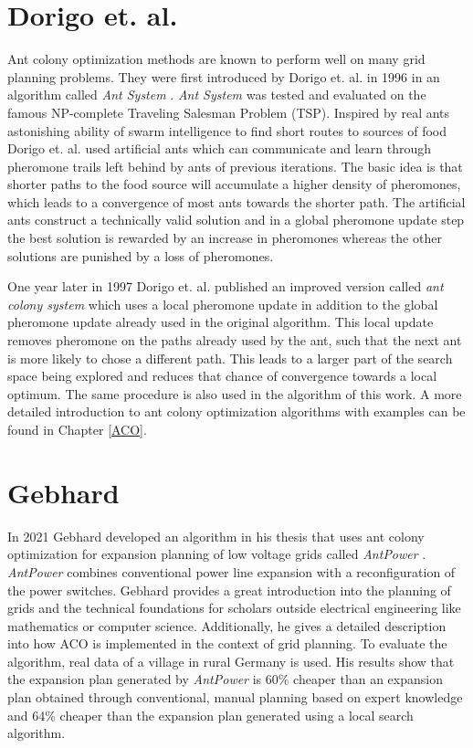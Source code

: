 \section{Dorigo et. al.}
Ant colony optimization methods are known to perform well on many grid planning problems. They were first introduced by Dorigo et. al. in 1996 in an algorithm called \textit{Ant System} \cite{ant_system}. \textit{Ant System} was tested and evaluated on the famous NP-complete Traveling Salesman Problem (TSP). Inspired by real ants astonishing ability of swarm intelligence to find short routes to sources of food Dorigo et. al. used artificial ants which can communicate and learn through pheromone trails left behind by ants of previous iterations.
The basic idea is that shorter paths to the food source will accumulate a higher density of pheromones, which leads to a convergence of most ants towards the shorter path. The artificial ants construct a technically valid solution and in a global pheromone update step the best solution is rewarded by an increase in pheromones whereas the other solutions are punished by a loss of pheromones.

One year later in 1997 Dorigo et. al. published an improved version called \textit{ant colony system} \cite{ant_coloy_system} which uses a local pheromone update in addition to the global pheromone update already used in the original algorithm. This local update removes pheromone on the paths already used by the ant, such that the next ant is more likely to chose a different path. This leads to a larger part of the search space being explored and reduces that chance of convergence towards a local optimum. The same procedure is also used in the algorithm of this work. A more detailed introduction to ant colony optimization algorithms with examples can be found in Chapter \ref{ACO}.\\

\section{Gebhard}
In 2021 Gebhard developed an algorithm in his thesis that uses ant colony optimization for expansion planning of low voltage grids called \textit{AntPower} \cite{gebhard2021expansion}. \textit{AntPower} combines conventional power line expansion with a reconfiguration of the power switches. Gebhard provides a great introduction into the planning of grids and the technical foundations for scholars outside electrical engineering like mathematics or computer science. Additionally, he gives a detailed description into how ACO is implemented in the context of grid planning. To evaluate the algorithm, real data of a village in rural Germany is used. His results show that the expansion plan generated by \textit{AntPower} is 60\% cheaper than an expansion plan obtained through conventional, manual planning based on expert knowledge and 64\% cheaper than the expansion plan generated using a local search algorithm.

